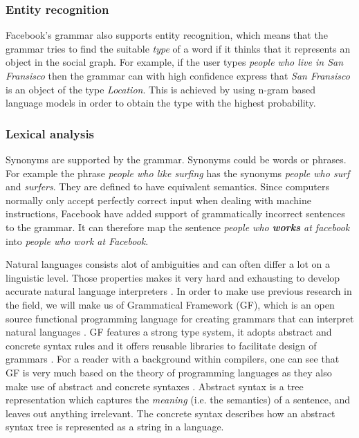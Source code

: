 \subsubsection*{Entity recognition}
Facebook's grammar also supports entity recognition, which means that the grammar tries to find the suitable \emph{type} of a word if it thinks that it represents an object in the social graph. For example, if the user types \emph{people who live in San Fransisco} then the grammar can with high confidence express that \emph{San Fransisco} is an object of the type \emph{Location}. This is achieved by using n-gram based language models in order to obtain the type with the highest probability.

\subsubsection*{Lexical analysis}
Synonyms are supported by the grammar. Synonyms could be words or phrases. For example the phrase \emph{people who like surfing} has the synonyms \emph{people who surf} and \emph{surfers}. They are defined to have equivalent semantics.
\newline
\newline
Since computers normally only accept perfectly correct input when dealing with machine instructions, Facebook have added support of grammatically incorrect sentences to the grammar. It can therefore map the sentence \emph{people who \textbf{works} at facebook} into \emph{people who work at Facebook}.

\label{sec:gf}
Natural languages consists alot of ambiguities and can often differ a lot on a linguistic level. Those properties makes it very hard and exhausting to develop accurate natural language interpreters \cite{kaufmann:2007}. In order to make use previous research in the field, we will make us of Grammatical Framework (GF), which is an open source functional programming language for creating grammars that can interpret natural languages \cite[p. 1]{ranta:2011}. GF features a strong type system, it adopts abstract and concrete syntax rules and it offers reusable libraries to facilitate design of grammars \cite{gf-rgl}. For a reader with a background within compilers, one can see that GF is very much based on the theory of programming languages as they also make use of abstract and concrete syntaxes \cite[pp. 69-70]{Aho:1986:CPT:6448}.
\newline
\newline
Abstract syntax is a tree representation which captures the \emph{meaning} (i.e. the semantics) of a sentence, and leaves out anything irrelevant. The concrete syntax describes how an abstract syntax tree is represented as a string in a language.

